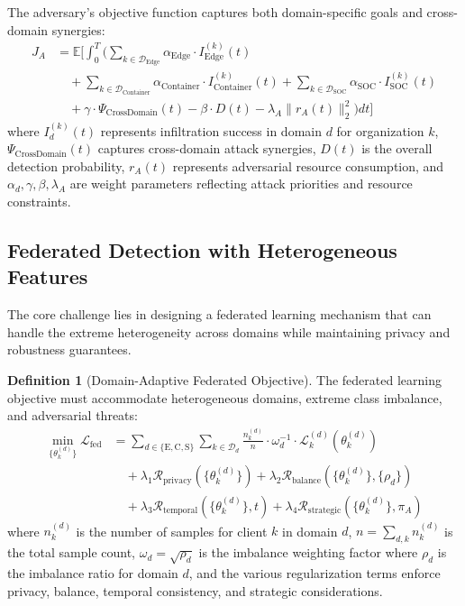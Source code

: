 \documentclass[12pt,a4paper]{article}
\theoremstyle{definition}
\newtheorem{definition}[theorem]{Definition}
\newcommand{\E}{\mathbb{E}}
\newcommand{\D}{\mathcal{D}}
\begin{document}
The adversary's objective function captures both domain-specific goals and cross-domain synergies:
\begin{align}
J_A &= \E\Bigg[\int_0^T \Bigg(\sum_{k \in \D_{\text{Edge}}} \alpha_{\text{Edge}} \cdot I_{\text{Edge}}^{(k)}(t) \nonumber\\
&\quad + \sum_{k \in \D_{\text{Container}}} \alpha_{\text{Container}} \cdot I_{\text{Container}}^{(k)}(t) + \sum_{k \in \D_{\text{SOC}}} \alpha_{\text{SOC}} \cdot I_{\text{SOC}}^{(k)}(t) \nonumber \\
&\quad + \gamma \cdot \Psi_{\text{CrossDomain}}(t) - \beta \cdot D(t) - \lambda_A \|r_A(t)\|_2^2\Bigg) dt\Bigg]
\end{align}
where $I_d^{(k)}(t)$ represents infiltration success in domain $d$ for organization $k$, $\Psi_{\text{CrossDomain}}(t)$ captures cross-domain attack synergies, $D(t)$ is the overall detection probability, $r_A(t)$ represents adversarial resource consumption, and $\alpha_d, \gamma, \beta, \lambda_A$ are weight parameters reflecting attack priorities and resource constraints.

\subsection{Federated Detection with Heterogeneous Features}

The core challenge lies in designing a federated learning mechanism that can handle the extreme heterogeneity across domains while maintaining privacy and robustness guarantees.

\begin{definition}[Domain-Adaptive Federated Objective]
\label{def:federated_objective}
The federated learning objective must accommodate heterogeneous domains, extreme class imbalance, and adversarial threats:
\begin{align}
\min_{\{\theta_k^{(d)}\}} \mathcal{L}_{\text{fed}} &= \sum_{d \in \{\text{E}, \text{C}, \text{S}\}} \sum_{k \in \D_d} \frac{n_k^{(d)}}{n} \cdot \omega_d^{-1} \cdot \mathcal{L}_k^{(d)}(\theta_k^{(d)}) \label{eq:federated_objective}\\
&\quad + \lambda_1 \mathcal{R}_{\text{privacy}}(\{\theta_k^{(d)}\}) + \lambda_2 \mathcal{R}_{\text{balance}}(\{\theta_k^{(d)}\}, \{\rho_d\}) \nonumber \\
&\quad + \lambda_3 \mathcal{R}_{\text{temporal}}(\{\theta_k^{(d)}\}, t) + \lambda_4 \mathcal{R}_{\text{strategic}}(\{\theta_k^{(d)}\}, \pi_A) \nonumber
\end{align}
where $n_k^{(d)}$ is the number of samples for client $k$ in domain $d$, $n = \sum_{d,k} n_k^{(d)}$ is the total sample count, $\omega_d = \sqrt{\rho_d}$ is the imbalance weighting factor where $\rho_d$ is the imbalance ratio for domain $d$, and the various regularization terms enforce privacy, balance, temporal consistency, and strategic considerations.
\end{definition}
\end{document}
